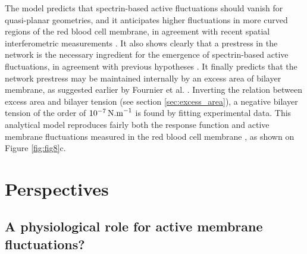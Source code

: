 \documentclass[graybox]{svmult}
\begin{document}
The model predicts that spectrin-based active fluctuations should vanish for quasi-planar geometries, and it anticipates higher fluctuations in more curved regions of the red blood cell membrane, in agreement with recent spatial interferometric measurements \cite{Park:2010}. It also shows clearly that a prestress in the network is the necessary ingredient for the emergence of spectrin-based active fluctuations, in agreement with previous hypotheses \cite{Gov:2005,Gov:2007}. It finally predicts that the network prestress may be maintained internally by an excess area of bilayer membrane, as suggested earlier by Fournier et al. \cite{Fournier:2004}. Inverting the relation between excess area and bilayer tension (see section \ref{sec:excess_area}), a negative bilayer tension of the order of $10^{-7}\,\rm{N.m}^{-1}$ is found by fitting experimental data. This analytical model reproduces fairly both the response function and active membrane fluctuations measured in the red blood cell membrane \cite{Turlier:2016}, as shown on Figure \ref{fig:fig8}c.

\section{Perspectives}
 
		\subsection{A physiological role for active membrane fluctuations?}
\end{document}
